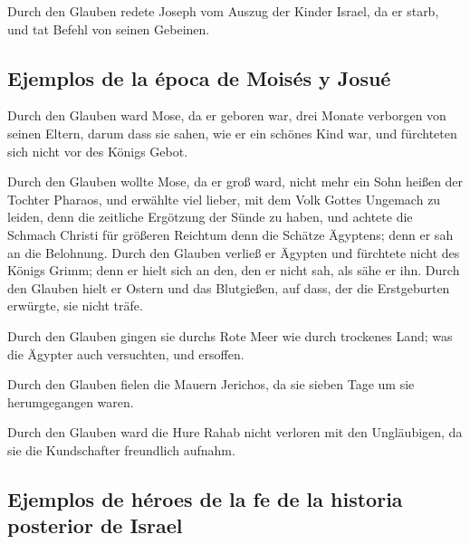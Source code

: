  Durch den Glauben redete Joseph vom Auszug der Kinder
Israel, da er starb, und tat Befehl von seinen Gebeinen.

\hypertarget{ejemplos-de-la-uxe9poca-de-moisuxe9s-y-josuuxe9}{%
\subsection{Ejemplos de la época de Moisés y
Josué}\label{ejemplos-de-la-uxe9poca-de-moisuxe9s-y-josuuxe9}}

 Durch den Glauben ward Mose, da er geboren war, drei
Monate verborgen von seinen Eltern, darum dass sie sahen, wie er ein
schönes Kind war, und fürchteten sich nicht vor des Königs Gebot.

 Durch den Glauben wollte Mose, da er groß ward, nicht
mehr ein Sohn heißen der Tochter Pharaos,  und erwählte
viel lieber, mit dem Volk Gottes Ungemach zu leiden, denn die zeitliche
Ergötzung der Sünde zu haben,  und achtete die Schmach
Christi für größeren Reichtum denn die Schätze Ägyptens; denn er sah an
die Belohnung.  Durch den Glauben verließ er Ägypten und
fürchtete nicht des Königs Grimm; denn er hielt sich an den, den er
nicht sah, als sähe er ihn.  Durch den Glauben hielt er
Ostern und das Blutgießen, auf dass, der die Erstgeburten erwürgte, sie
nicht träfe.

 Durch den Glauben gingen sie durchs Rote Meer wie durch
trockenes Land; was die Ägypter auch versuchten, und ersoffen.

 Durch den Glauben fielen die Mauern Jerichos, da sie
sieben Tage um sie herumgegangen waren.

 Durch den Glauben ward die Hure Rahab nicht verloren mit
den Ungläubigen, da sie die Kundschafter freundlich aufnahm.

\hypertarget{ejemplos-de-huxe9roes-de-la-fe-de-la-historia-posterior-de-israel}{%
\subsection{Ejemplos de héroes de la fe de la historia posterior de
Israel}\label{ejemplos-de-huxe9roes-de-la-fe-de-la-historia-posterior-de-israel}}

